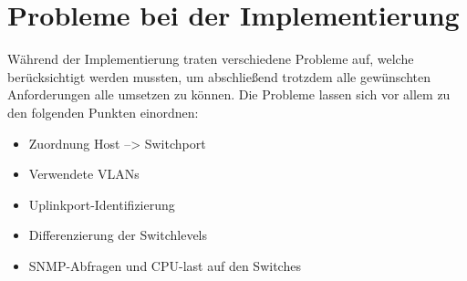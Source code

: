 \section{Probleme bei der Implementierung}
\label{sec:probimp}

Während der Implementierung traten verschiedene Probleme auf, welche berücksichtigt werden mussten, um abschließend trotzdem alle gewünschten Anforderungen alle umsetzen zu können.
Die Probleme lassen sich vor allem zu den folgenden Punkten einordnen:\\
\begin{itemize}
\item Zuordnung Host --> Switchport
\item Verwendete VLANs
\item Uplinkport-Identifizierung
\item Differenzierung der Switchlevels
\item SNMP-Abfragen und CPU-last auf den Switches
\end{itemize}

